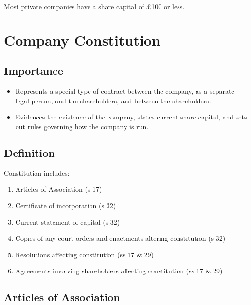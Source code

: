 \documentclass[
]{article}
\newenvironment{Shaded}{}{}
\newcommand{\NormalTok}[1]{#1}
\providecommand{\tightlist}{%
  \setlength{\itemsep}{0pt}\setlength{\parskip}{0pt}}
\begin{document}
\begin{Shaded}
\begin{Highlighting}[]
\NormalTok{Most private companies have a share capital of £100 or less.}
\end{Highlighting}
\end{Shaded}

\hypertarget{company-constitution}{%
\section{Company Constitution}\label{company-constitution}}

\hypertarget{importance}{%
\subsection{Importance}\label{importance}}

\begin{itemize}
\tightlist
\item
  Represents a special type of contract between the company, as a
  separate legal person, and the shareholders, and between the
  shareholders.
\item
  Evidences the existence of the company, states current share capital,
  and sets out rules governing how the company is run.
\end{itemize}

\hypertarget{definition}{%
\subsection{Definition}\label{definition}}

Constitution includes:

\begin{enumerate}
\def\labelenumi{\arabic{enumi}.}
\tightlist
\item
  Articles of Association (s 17)
\item
  Certificate of incorporation (s 32)
\item
  Current statement of capital (s 32)
\item
  Copies of any court orders and enactments altering constitution (s 32)
\item
  Resolutions affecting constitution (ss 17 \& 29)
\item
  Agreements involving shareholders affecting constitution (ss 17 \& 29)
\end{enumerate}

\hypertarget{articles-of-association}{%
\subsection{Articles of Association}\label{articles-of-association}}
\end{document}
